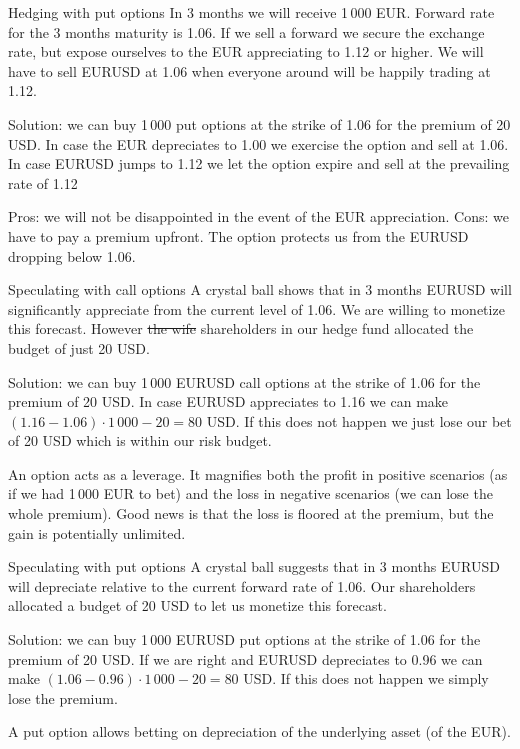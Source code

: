 \documentclass{beamer}
\begin{document}
\begin{frame}{Hedging with put options}
\justify
In 3 months we will receive 1\,000 EUR. Forward rate for the 3 months maturity is 1.06. If we sell a forward we secure the exchange rate, but expose ourselves to the EUR appreciating to 1.12 or higher. We will have to sell EURUSD at 1.06 when everyone around will be happily trading at 1.12.

\justify
Solution: we can buy 1\,000 put options at the strike of 1.06 for the premium of 20 USD. In case the EUR depreciates to 1.00 we exercise the option and sell at 1.06. In case EURUSD jumps to 1.12 we let the option expire and sell at the prevailing rate of 1.12

\justify
Pros: we will not be disappointed in the event of the EUR appreciation. Cons: we have to pay a premium upfront. The option protects us from the EURUSD dropping below 1.06.
\end{frame}



\begin{frame}{Speculating with call options}
\justify
A crystal ball shows that in 3 months EURUSD will significantly \alert{appreciate} from the current level of 1.06. We are willing to monetize this forecast. However \sout{the wife} shareholders in our hedge fund allocated the budget of just 20 USD.

\justify
Solution: we can buy 1\,000 EURUSD \alert{call} options at the strike of 1.06 for the premium of 20 USD. In case EURUSD appreciates to 1.16 we can make $(1.16 - 1.06) \cdot 1\,000 - 20 = 80$ USD. If this does not happen we just lose our bet of 20 USD which is within our risk budget.

\justify
An option acts as a leverage. It magnifies both the profit in positive scenarios (as if we had 1\,000 EUR to bet) and the loss in negative scenarios (we can lose the whole premium). Good news is that the loss is floored at the premium, but the gain is potentially unlimited.
\end{frame}



\begin{frame}{Speculating with put options}
\justify
A crystal ball suggests that in 3 months EURUSD will \alert{depreciate} relative to the current forward rate of 1.06. Our shareholders allocated a budget of 20 USD to let us monetize this forecast.

\justify
Solution: we can buy 1\,000 EURUSD \alert{put} options at the strike of 1.06 for the premium of 20 USD. If we are right and EURUSD depreciates to 0.96 we can make $(1.06 - 0.96)\cdot1\,000 - 20 = 80$ USD. If this does not happen we simply lose the premium.

\justify
A put option allows betting on depreciation of the underlying asset (of the EUR).
\end{frame}
\end{document}
